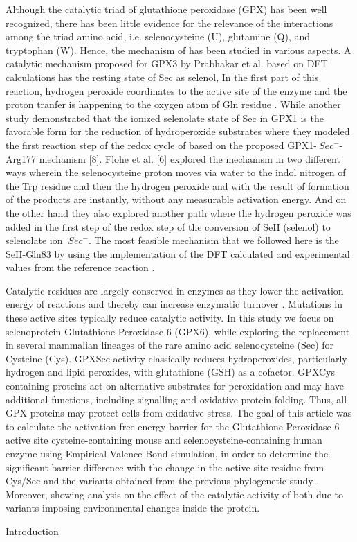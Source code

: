 \documentclass[journal=jacsat,manuscript=article]{achemso}
\begin{document}
Although the catalytic triad of glutathione peroxidase (GPX) has been well recognized, there has been little evidence for the relevance of the interactions among the triad amino acid, i.e. selenocysteine (U), glutamine (Q), and tryptophan (W). Hence, the mechanism of has been studied in various aspects. A catalytic mechanism proposed for GPX3 by Prabhakar et al. based on DFT calculations has the resting state of Sec as selenol, In the first part of this reaction, hydrogen peroxide coordinates to the active site of the enzyme and the proton tranfer is happening to the oxygen atom of Gln residue \cite{prabhakar_elucidation_2005,prabhakar_is_2006}. While another study demonstrated that the ionized selenolate state of Sec in GPX1 is the favorable form for the reduction of hydroperoxide substrates where they modeled the ﬁrst reaction step of the redox cycle of based on the proposed GPX1-\({\ Sec^-}\)- Arg177 mechanism [8]. Flohe et al. [6]\cite{orian_selenocysteine_2015} explored the mechanism in two different ways wherein the selenocysteine proton moves via water to the indol nitrogen of the Trp residue and then the hydrogen peroxide and with the result of formation of  the products are instantly, without any measurable activation energy. And on the other hand they also explored another path where the hydrogen peroxide was added in the first step of the redox step of the conversion of SeH (selenol) to selenolate ion \({\ Sec^-}\)\cite{flohe_glutathione_2022,orian_selenocysteine_2015}. The most feasible mechanism that we followed here is the SeH-Gln83 by using the implementation of the DFT calculated and experimental values from the reference reaction \cite{prabhakar_is_2006}. 

Catalytic residues are largely conserved in enzymes as they lower the activation energy of reactions and thereby can increase enzymatic turnover \cite{rees_ancient_2024}. Mutations in these active sites typically reduce catalytic activity. In this study we focus on selenoprotein Glutathione Peroxidase 6 (GPX6), while exploring the replacement in several mammalian lineages of the rare amino acid selenocysteine (Sec) for Cysteine (Cys). GPXSec activity classically reduces hydroperoxides, particularly hydrogen and lipid peroxides, with glutathione (GSH) as a cofactor. GPXCys containing proteins act on alternative substrates for peroxidation and may have additional functions, including signalling and oxidative protein folding. Thus, all GPX proteins may protect cells from oxidative stress. The goal of this article was to calculate the activation free energy barrier for the Glutathione Peroxidase 6 active site cysteine-containing mouse and selenocysteine-containing human enzyme using Empirical Valence Bond simulation, in order to determine the significant barrier difference with the change in the active site residue from Cys/Sec and the variants obtained from the previous phylogenetic study \cite{rees_ancient_2024}. Moreover, showing analysis on the effect of the catalytic activity of both due to variants imposing environmental changes inside the protein.  

\hyperref[sec:intro]{Introduction}


\end{document}
